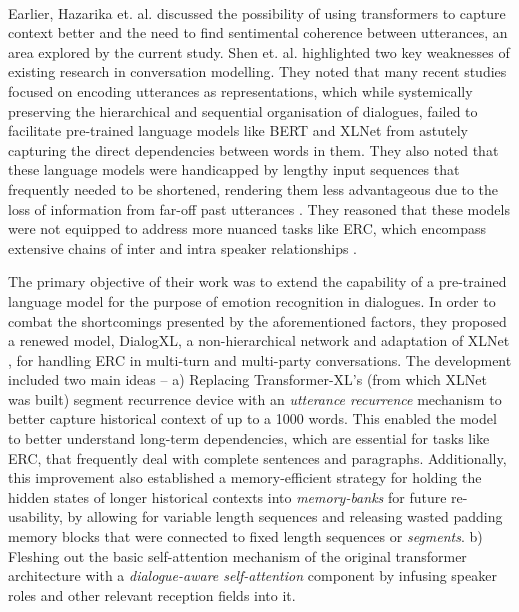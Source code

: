 \\
Earlier, Hazarika et. al. \cite{Hazarika2019ConversationalTL} discussed the possibility of using transformers to capture context better and the need to find sentimental coherence between utterances, an area explored by the current study. Shen et. al. highlighted two key weaknesses of existing research in conversation modelling. They noted that many recent studies focused on encoding utterances as representations, which while systemically preserving the hierarchical and sequential organisation of dialogues, failed to facilitate pre-trained language models like BERT \cite{Devlin2019BERTPO} and XLNet \cite{Yang2019XLNetGA} from astutely capturing the direct dependencies between words in them. They also noted that these language models were handicapped by lengthy input sequences that frequently needed to be shortened, rendering them less advantageous due to the loss of information from far-off past utterances \cite{Ghosal2019DialogueGCNAG,Majumder2018DialogueRNNAA}. They reasoned that these models were not equipped to address more nuanced tasks like ERC, which encompass extensive chains of inter and intra speaker relationships \cite{Shen2020DialogXLAX}.

The primary objective of their work was to extend the capability of a pre-trained language model for the purpose of emotion recognition in dialogues. In order to combat the shortcomings presented by the aforementioned factors, they proposed a renewed model, DialogXL, a non-hierarchical network and adaptation of XLNet \cite{Yang2019XLNetGA}, for handling ERC in multi-turn and multi-party conversations. The development included two main ideas -- a) Replacing Transformer-XL's \cite{Dai2019TransformerXLAL} (from which XLNet was built) segment recurrence device with an \textit{utterance recurrence} mechanism to better capture historical context of up to a 1000 words. This enabled the model to better understand long-term dependencies, which are essential for tasks like ERC, that frequently deal with complete sentences and paragraphs. Additionally, this improvement also established a memory-efficient strategy for holding the hidden states of longer historical contexts into \textit{memory-banks} for future re-usability, by allowing for variable length sequences and releasing wasted padding memory blocks that were connected to fixed length sequences or \textit{segments}. b) Fleshing out the basic self-attention mechanism of the original transformer architecture with a \textit{dialogue-aware self-attention} component by infusing speaker roles and other relevant reception fields into it.

